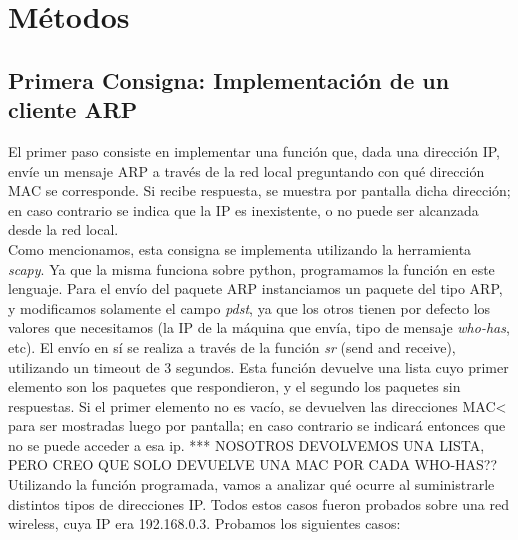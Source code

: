 \section{M\'etodos}


\subsection{Primera Consigna: Implementaci\'on de un cliente ARP}
El primer paso consiste en implementar una funci\'on que, dada una direcci\'on IP, env\'ie un mensaje ARP a trav\'es de la red local preguntando con qu\'e direcci\'on MAC se corresponde. Si recibe respuesta, se muestra por pantalla dicha direcci\'on; en caso contrario se indica que la IP es inexistente, o no puede ser alcanzada desde la red local.\\

Como mencionamos, esta consigna se implementa utilizando la herramienta \emph{scapy}. Ya que la misma funciona sobre python, programamos la funci\'on en este lenguaje. Para el env\'io del paquete ARP instanciamos un paquete del tipo ARP, y modificamos solamente el campo \emph{pdst}, ya que los otros tienen por defecto los valores que necesitamos (la IP de la m\'aquina que env\'ia, tipo de mensaje \emph{who-has}, etc). El env\'io en s\'i se realiza a trav\'es de la funci\'on \emph{sr} (send and receive), utilizando un timeout de 3 segundos. Esta funci\'on devuelve una lista cuyo primer elemento son los paquetes que respondieron, y el segundo los paquetes sin respuestas. Si el primer elemento no es vac\'io, se devuelven las direcciones MAC< para ser mostradas luego por pantalla; en caso contrario se indicar\'a entonces que no se puede acceder a esa ip. *** NOSOTROS DEVOLVEMOS UNA LISTA, PERO  CREO QUE SOLO DEVUELVE UNA MAC POR CADA WHO-HAS??\\

Utilizando la funci\'on programada, vamos a analizar qu\'e ocurre al suministrarle distintos tipos de direcciones IP. Todos estos casos fueron probados sobre una red wireless, cuya IP era 192.168.0.3. Probamos los siguientes casos:

